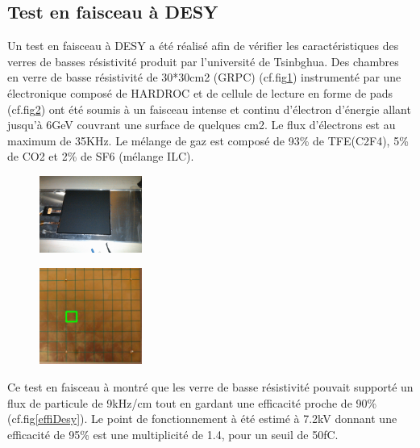 \subsection{Test en faisceau à DESY}
Un test en faisceau à DESY \cite{Haddad:2012fx} a été réalisé afin de vérifier les caractéristiques des verres de basses résistivité produit par l'université de Tsinbghua. Des chambres en verre de basse résistivité de 30*30cm2 (GRPC) (cf.fig\ref{chambre}) instrumenté par une électronique composé de HARDROC et de cellule de lecture en forme de pads (cf.fig\ref{cellule}) ont été soumis à un faisceau intense et continu d'électron d'énergie allant jusqu'à 6GeV couvrant une surface de quelques cm2. Le flux d'électrons est au maximum de 35KHz. Le mélange de gaz est composé de 93\% de TFE(C2F4), 5\% de CO2 et 2\% de SF6 (mélange ILC).
\begin{figure}[ht!]
	\centering
	\includegraphics[width=0.3\textwidth]{GLA/chambre.png}
	\label{chambre}
\end{figure}
\begin{figure}[ht!]
	\centering
	\includegraphics[width=0.3\textwidth]{GLA/cellules.png}
	\label{cellule}
\end{figure}

Ce test en faisceau à montré que les verre de basse résistivité pouvait supporté un flux de particule de 9kHz/cm tout en gardant une efficacité proche de 90\% (cf.fig\ref{effiDesy}). Le point de fonctionnement à été estimé à 7.2kV donnant une efficacité de 95\% est une multiplicité de 1.4, pour un seuil de 50fC. 

